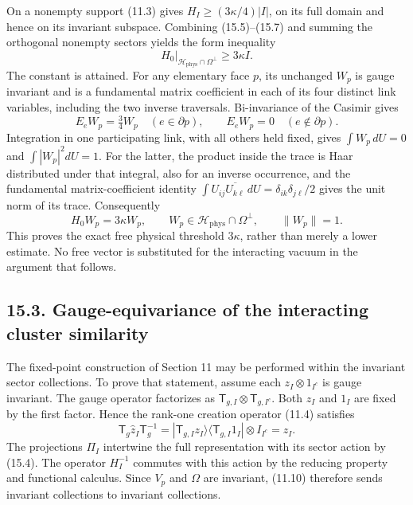 \documentclass[
]{article}
\begin{document}
On a nonempty support (11.3) gives \(H_I\ge(3\kappa/4)|I|\), on its full
domain and hence on its invariant subspace. Combining (15.5)--(15.7) and
summing the orthogonal nonempty sectors yields the form inequality \[
H_0\big|_{\mathcal H_{\mathrm{phys}}\cap\Omega^\perp}
 \ge 3\kappa I.                                             \tag{15.8}
\] The constant is attained. For any elementary face \(p\), its
unchanged \(W_p\) is gauge invariant and is a fundamental matrix
coefficient in each of its four distinct link variables, including the
two inverse traversals. Bi-invariance of the Casimir gives \[
E_eW_p=\tfrac34W_p\quad(e\in\partial p),\qquad
E_eW_p=0\quad(e\notin\partial p).
\] Integration in one participating link, with all others held fixed,
gives \(\int W_p\,dU=0\) and \(\int |W_p|^2dU=1\). For the latter, the
product inside the trace is Haar distributed under that integral, also
for an inverse occurrence, and the fundamental matrix-coefficient
identity \(\int U_{ij}\overline{U_{k\ell}}\,dU
 =\delta_{ik}\delta_{j\ell}/2\) gives the unit norm of its trace.
Consequently \[
H_0W_p=3\kappa W_p,\qquad
W_p\in\mathcal H_{\mathrm{phys}}\cap\Omega^\perp,\qquad
\|W_p\|=1.                                                   \tag{15.9}
\] This proves the exact free physical threshold \(3\kappa\), rather
than merely a lower estimate. No free vector is substituted for the
interacting vacuum in the argument that follows.

\subsection{15.3. Gauge-equivariance of the interacting cluster
similarity}\label{gauge-equivariance-of-the-interacting-cluster-similarity}

The fixed-point construction of Section 11 may be performed within the
invariant sector collections. To prove that statement, assume each
\(z_I\otimes1_{I^c}\) is gauge invariant. The gauge operator factorizes
as \(\mathsf T_{g,I}\otimes\mathsf T_{g,I^c}\). Both \(z_I\) and \(1_I\)
are fixed by the first factor. Hence the rank-one creation operator
(11.4) satisfies \[
\mathsf T_g\widehat z_I\mathsf T_g^{-1}
 =|\mathsf T_{g,I}z_I\rangle
   \langle\mathsf T_{g,I}1_I|\otimes I_{I^c}
 =\widehat z_I.                                             \tag{15.10}
\] The projections \(\Pi_I\) intertwine the full representation with its
sector action by (15.4). The operator \(H_I^{-1}\) commutes with this
action by the reducing property and functional calculus. Since \(V_p\)
and \(\Omega\) are invariant, (11.10) therefore sends invariant
collections to invariant collections.
\end{document}
